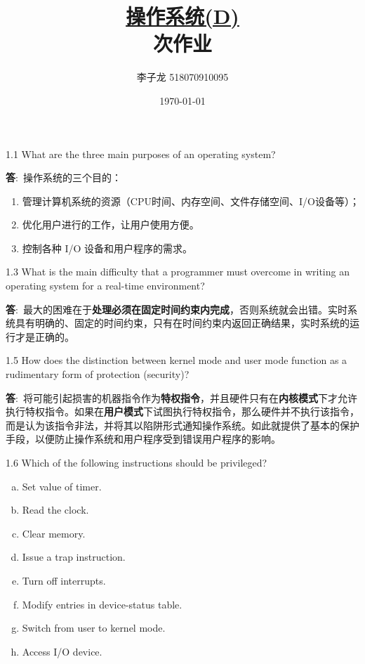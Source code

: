 \documentclass[12pt,a4paper]{article}
\newenvironment{problems}{\begin{list}{}{\renewcommand{\makelabel}[1]{\textbf{##1}\hfil}}}{\end{list}}
\providecommand{\ans}{\textbf{答}:~}
\begin{document}
\title{\normalsize \underline{操作系统(D)}\\ 次作业}
\author{李子龙 518070910095}
\date{\today}
\maketitle

\begin{problems}
    \item[1.1] What are the three main purposes of an operating system?
    
    \ans 操作系统的三个目的：
    \begin{enumerate}
        \item 管理计算机系统的资源（CPU时间、内存空间、文件存储空间、I/O设备等）；
        \item 优化用户进行的工作，让用户使用方便。
        \item 控制各种 I/O 设备和用户程序的需求。
    \end{enumerate}
    \item[1.3] What is the main difficulty that a programmer must overcome in writing
    an operating system for a real-time environment?

    \ans 最大的困难在于\textbf{处理必须在固定时间约束内完成}，否则系统就会出错。实时系统具有明确的、固定的时间约束，只有在时间约束内返回正确结果，实时系统的运行才是正确的。
    \item[1.5] How does the distinction between kernel mode and user mode function
    as a rudimentary form of protection (security)?

    \ans 将可能引起损害的机器指令作为\textbf{特权指令}，并且硬件只有在\textbf{内核模式}下才允许执行特权指令。如果在\textbf{用户模式}下试图执行特权指令，那么硬件并不执行该指令，而是认为该指令非法，并将其以陷阱形式通知操作系统。如此就提供了基本的保护手段，以便防止操作系统和用户程序受到错误用户程序的影响。
    \item[1.6] Which of the following instructions should be privileged?
    \begin{enumerate}[a.]
        \item Set value of timer.
        \item Read the clock.
        \item Clear memory.
        \item Issue a trap instruction.
        \item Turn off interrupts.
        \item Modify entries in device-status table.
        \item Switch from user to kernel mode.
        \item Access I/O device.
    \end{enumerate}


\end{problems}
\end{document}
